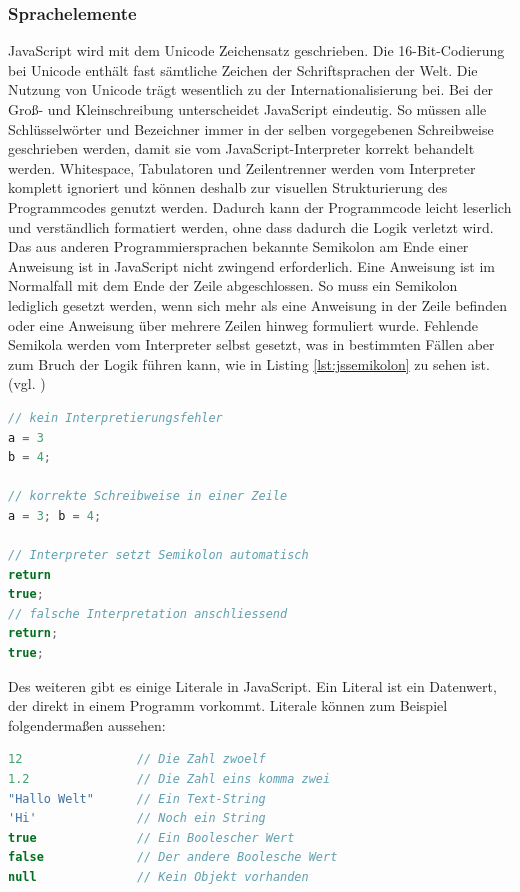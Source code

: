\subsubsection{Sprachelemente} JavaScript wird mit dem Unicode Zeichensatz geschrieben. Die 16-Bit-Codierung bei Unicode enthält fast sämtliche Zeichen der Schriftsprachen der Welt. Die Nutzung von Unicode trägt wesentlich zu der Internationalisierung bei. Bei der Groß- und Kleinschreibung unterscheidet JavaScript eindeutig. So müssen alle Schlüsselwörter und Bezeichner immer in der selben vorgegebenen Schreibweise geschrieben werden, damit sie vom JavaScript-Interpreter korrekt behandelt werden. Whitespace, Tabulatoren und Zeilentrenner werden vom Interpreter komplett ignoriert und können deshalb zur visuellen Strukturierung des Programmcodes genutzt werden. Dadurch kann der Programmcode leicht leserlich und verständlich formatiert werden, ohne dass dadurch die Logik verletzt wird. Das aus anderen Programmiersprachen bekannte Semikolon am Ende einer Anweisung ist in JavaScript nicht zwingend erforderlich. Eine Anweisung ist im Normalfall mit dem Ende der Zeile abgeschlossen. So muss ein Semikolon lediglich gesetzt werden, wenn sich mehr als eine Anweisung in der Zeile befinden oder eine Anweisung über mehrere Zeilen hinweg formuliert wurde. Fehlende Semikola werden vom Interpreter selbst gesetzt, was in bestimmten Fällen aber zum Bruch der Logik führen kann, wie in Listing \ref{lst:jssemikolon} zu sehen ist.(vgl. \cite[S.15ff]{FlanJava2007})

\vspace{1em}
\begin{lstlisting}[language=JavaScript, caption=JavaScript Logikbruch Semikolon, label=lst:jssemikolon]
// kein Interpretierungsfehler
a = 3
b = 4;

// korrekte Schreibweise in einer Zeile
a = 3; b = 4;

// Interpreter setzt Semikolon automatisch
return
true;
// falsche Interpretation anschliessend
return;
true;
\end{lstlisting}

Des weiteren gibt es einige Literale in JavaScript. \glqq Ein Literal ist ein Datenwert, der direkt in einem Programm vorkommt. Literale können zum Beispiel folgendermaßen aussehen:\grqq{}\cite[S.18]{FlanJava2007}

\vspace{1em}
\begin{lstlisting}[language=JavaScript, caption=JavaScript Literale, label=lst:jsliterale]
12                // Die Zahl zwoelf
1.2               // Die Zahl eins komma zwei
"Hallo Welt"      // Ein Text-String
'Hi'              // Noch ein String
true              // Ein Boolescher Wert
false             // Der andere Boolesche Wert
null              // Kein Objekt vorhanden
\end{lstlisting}
	
